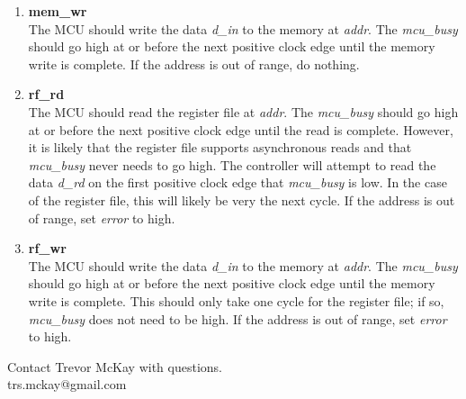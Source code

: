 \documentclass[10pt,a4paper]{article}
\begin{document}
\begin{enumerate}
    \item\textbf{mem\_wr}\\
    The MCU should write the data \emph{d\_in} to the memory at \emph{addr}. The \emph{mcu\_busy} should go
    high at or before the next positive clock edge until the memory write is complete.
    If the address is out of range, do nothing.

    \item\textbf{rf\_rd}\\
    The MCU should read the register file at \emph{addr}. The \emph{mcu\_busy} should go
    high at or before the next positive clock edge until the read is complete. However, it is
    likely that the register file supports asynchronous reads and that \emph{mcu\_busy} never
    needs to go high. The controller will attempt to read the data \emph{d\_rd} on the first positive clock edge that
    \emph{mcu\_busy} is low. In the case of the register file, this will likely be very the next
    cycle. If the address is out of range, set \emph{error} to high.


    \item\textbf{rf\_wr}\\
    The MCU should write the data \emph{d\_in} to the memory at \emph{addr}. The \emph{mcu\_busy} should go
    high at or before the next positive clock edge until the memory write is complete. This should
    only take one cycle for the register file; if so, \emph{mcu\_busy} does not need to be high.
    If the address is out of range, set \emph{error} to high.

\end{enumerate}

\vspace*{\fill}
\begin{center}
    \noindent Contact Trevor McKay with questions.\\
    trs.mckay@gmail.com
\end{center}
\end{document}
